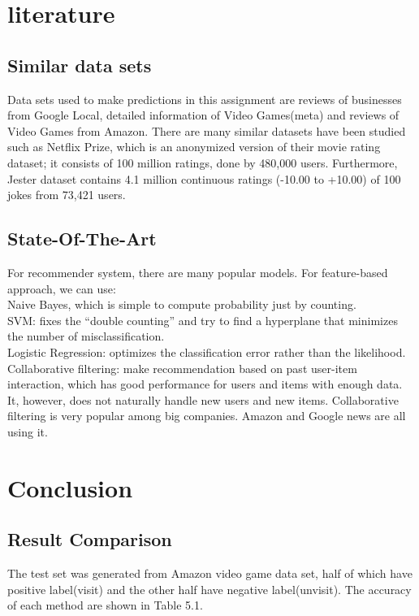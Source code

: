 \documentclass[paper=a4, fontsize=11pt, twocolumn]{scrartcl} %
\numberwithin{equation}{section} %
\numberwithin{figure}{section} %
\numberwithin{table}{section} %
\begin{document}
\section{literature}


\subsection{Similar data sets}

Data sets used to make predictions in this assignment are reviews of businesses from Google Local, detailed information of Video Games(meta) and reviews of Video Games from Amazon. There are many similar datasets have been studied such as Netflix Prize, which is an anonymized version of their movie rating dataset; it consists of 100 million ratings, done by 480,000 users. Furthermore, Jester dataset contains 4.1 million continuous ratings (-10.00 to +10.00) of 100 jokes from 73,421 users.

\subsection{State-Of-The-Art}
For recommender system, there are many popular models. For feature-based approach, we can use:\\
Naive Bayes, which is simple to compute probability just by counting.\\
SVM: fixes the “double counting” and try to find a hyperplane that minimizes the number of misclassification.\\
Logistic Regression: optimizes the classification error rather than the likelihood. \\
Collaborative filtering: make recommendation based on past user-item interaction, which has good performance for users and items with enough data. It, however, does not naturally handle new users and new items. Collaborative filtering is very popular among big companies. Amazon and Google news are all using it.

\section{Conclusion}

\subsection{Result Comparison}

The test set was generated from Amazon video game data set, half of which have positive label(visit) and the other half have negative label(unvisit). The accuracy of each method are shown in Table 5.1.
\end{document}
